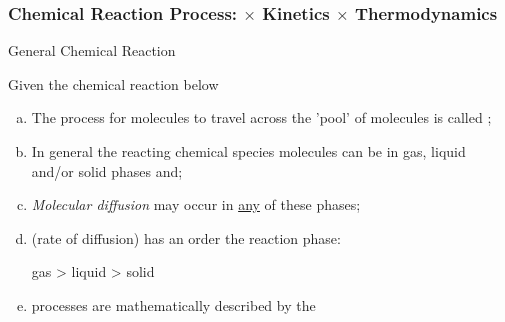 \documentclass[10pt,compress,unknownkeysallowed]{beamer}
\begin{document}
\begin{frame}
  \frametitle{Chemical Reaction Process:  $\times$ Kinetics $\times$ Thermodynamics}

  \begin{block}{\begin{center}General Chemical Reaction\end{center}}
     Given the chemical reaction below
  \end{block}  

   \begin{enumerate}[a)]
       \item<1-> The process for molecules to travel across the 'pool' of molecules is called ;
       \item<2-> In general the reacting chemical species molecules can be in gas, liquid and/or solid phases and;
       \item<2-> {\it Molecular diffusion} may occur in \underline{any} of these phases;
       \item<3->  (\ie rate of diffusion) has an order \wrt the reaction phase:
               \begin{center} gas > liquid > solid\end{center}
       \item<3->  processes are mathematically described by the 
   \end{enumerate}
\end{frame}
\normalsize
\end{document}
